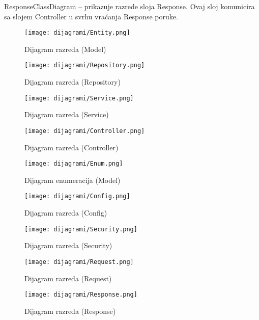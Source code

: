 ResponseClassDiagram – prikazuje razrede sloja Response. Ovaj sloj komunicira sa slojem Controller u svrhu vraćanja Response poruke.

\begin{figure}[H]
	\texttt{[image: dijagrami/Entity.png]}
	\centering
	\caption{Dijagram razreda (Model)}
	\label{fig:EntityClassDiagram}
\end{figure}

\begin{figure}[H]
	\texttt{[image: dijagrami/Repository.png]}
	\centering
	\caption{Dijagram razreda (Repository)}
	\label{fig:RepositoryClassDiagram}
\end{figure}

\begin{figure}[H]
	\texttt{[image: dijagrami/Service.png]}
	\centering
	\caption{Dijagram razreda (Service)}
	\label{fig:ServiceClassDiagram}
\end{figure}

\begin{figure}[H]
	\texttt{[image: dijagrami/Controller.png]}
	\centering
	\caption{Dijagram razreda (Controller)}
	\label{fig:ControllerClassDiagram}
\end{figure}

\begin{figure}[H]
	\texttt{[image: dijagrami/Enum.png]}
	\centering
	\caption{Dijagram enumeracija (Model)}
	\label{fig:EnumClassDiagram}
\end{figure}

\begin{figure}[H]
	\texttt{[image: dijagrami/Config.png]}
	\centering
	\caption{Dijagram razreda (Config)}
	\label{fig:ConfigClassDiagram}
\end{figure}

\begin{figure}[H]
	\texttt{[image: dijagrami/Security.png]}
	\centering
	\caption{Dijagram razreda (Security)}
	\label{fig:SecurityClassDiagram}
\end{figure}

\begin{figure}[H]
	\texttt{[image: dijagrami/Request.png]}
	\centering
	\caption{Dijagram razreda (Request)}
	\label{fig:RequestClassDiagrams}
\end{figure}

\begin{figure}[H]
	\texttt{[image: dijagrami/Response.png]}
	\centering
	\caption{Dijagram razreda (Response)}
	\label{fig:ResponseClassDiagram}
\end{figure}



